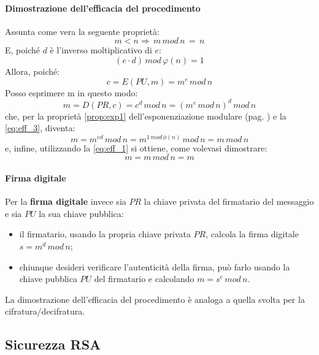 \paragraph{Dimostrazione dell'efficacia del procedimento}
Assunta come vera la seguente proprietà: 
\begin{equation}\label{eq:eff_1}
m<n \Rightarrow \, m \, mod \, n\,=\,n
\end{equation}
E, poiché $d$ è l'inverso moltiplicativo di $e$:
\begin{equation} \label{eq:eff_3}
(e \cdot d) \, mod \, \varphi(n) = 1
\end{equation}
Allora, poiché:
\begin{equation}
c=E(PU,m) = m^e \, mod \, n
\end{equation}
Posso esprimere m in questo modo:
\begin{equation}
m=D(PR,c) = c^d \, mod \, n = (m^e \, mod \, n)^d \, mod \, n
\end{equation}
che, per la proprietà \ref{prop:exp1} dell'esponenziazione modulare (pag. \pageref{prop:exp1}) e la \ref{eq:eff_3}, diventa:
\begin{equation}
m =  m^{ed} \, mod \, n = m^{1 \, mod \, \phi(n)} \, mod \, n = m \, mod \, n
\end{equation}
e, infine, utilizzando la \ref{eq:eff_1} si ottiene, come volevasi dimostrare:
\begin{equation}
m = m \, mod \, n = m
\end{equation}

\paragraph{Firma digitale}
Per la \textbf{firma digitale} invece sia $PR$ la chiave privata del firmatario del messaggio e sia $PU$ la sua chiave pubblica: 
\begin{itemize}
\item il firmatario, usando la propria chiave privata $PR$, calcola la firma digitale $s = m^d \, mod \, n$;
\item chiunque desideri verificare l'autenticità della firma, può farlo usando la chiave pubblica $PU$ del firmatario e calcolando $m = s^e \, mod \, n$.
\end{itemize}
La dimostrazione dell'efficacia del procedimento è analoga a quella svolta per la cifratura/decifratura.

\subsection{Sicurezza RSA}

